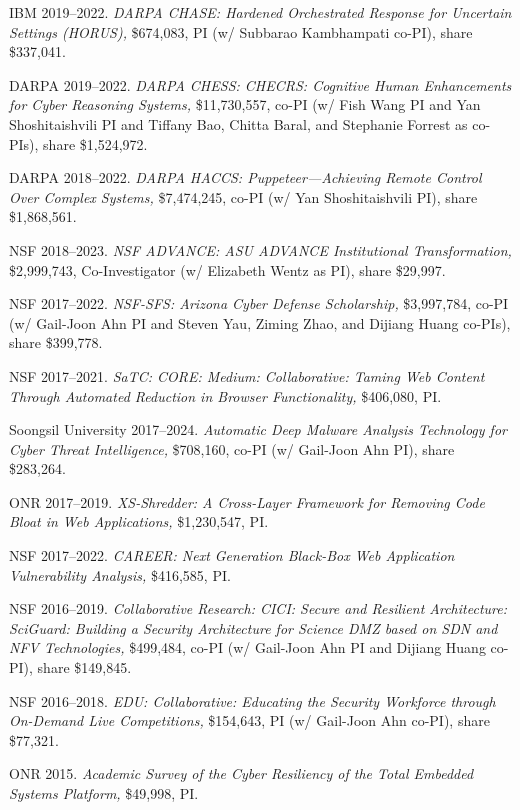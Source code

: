 \documentclass[11pt,letterpaper,sans]{moderncv}
\begin{document}
\begin{etaremune}
  \item IBM 2019--2022. \textit{DARPA CHASE: Hardened Orchestrated Response for Uncertain Settings (HORUS),} \$674,083, PI (w/ Subbarao Kambhampati co-PI), share \$337,041.

  \item DARPA 2019--2022. \textit{DARPA CHESS: CHECRS: Cognitive Human Enhancements for Cyber Reasoning Systems,} \$11,730,557, co-PI (w/ Fish Wang PI and Yan Shoshitaishvili PI and Tiffany Bao, Chitta Baral, and Stephanie Forrest as co-PIs), share \$1,524,972.

  \item DARPA 2018--2022. \textit{DARPA HACCS: Puppeteer---Achieving Remote Control Over Complex Systems,} \$7,474,245, co-PI (w/ Yan Shoshitaishvili PI), share \$1,868,561.

  \item NSF 2018--2023. \textit{NSF ADVANCE: ASU ADVANCE Institutional Transformation,} \$2,999,743, Co-Investigator (w/ Elizabeth Wentz as PI), share \$29,997.

  \item NSF 2017--2022. \textit{NSF-SFS: Arizona Cyber Defense
    Scholarship,} \$3,997,784, co-PI (w/ Gail-Joon Ahn PI and Steven
    Yau, Ziming Zhao, and Dijiang Huang co-PIs), share \$399,778.

  \item NSF 2017--2021. \textit{SaTC: CORE: Medium: Collaborative:
    Taming Web Content Through Automated Reduction in Browser
    Functionality,} \$406,080, PI.

  \item Soongsil University 2017--2024. \textit{Automatic Deep Malware
    Analysis Technology for Cyber Threat Intelligence,} \$708,160,
    co-PI (w/ Gail-Joon Ahn PI), share \$283,264.

  \item ONR 2017--2019. \textit{XS-Shredder: A Cross-Layer Framework
    for Removing Code Bloat in Web Applications,} \$1,230,547, PI.

  \item NSF 2017--2022. \textit{CAREER: Next Generation Black-Box Web
    Application Vulnerability Analysis,} \$416,585, PI.

  \item NSF 2016--2019. \textit{Collaborative Research: CICI: Secure
    and Resilient Architecture: SciGuard: Building a Security
    Architecture for Science DMZ based on SDN and NFV Technologies,}
    \$499,484, co-PI (w/ Gail-Joon Ahn PI and Dijiang Huang co-PI),
    share \$149,845.

  \item NSF 2016--2018. \textit{EDU: Collaborative: Educating the
    Security Workforce through On-Demand Live Competitions,}
    \$154,643, PI (w/ Gail-Joon Ahn co-PI), share \$77,321.

  \item ONR 2015. \textit{Academic Survey of the Cyber Resiliency of
    the Total Embedded Systems Platform,} \$49,998, PI.

\end{etaremune}
\end{document}
